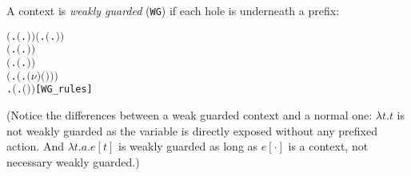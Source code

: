 A context is \emph{weakly guarded} (\texttt{WG}) if each hole is
underneath a prefix:
\begin{alltt}
\HOLTokenTurnstile{} \ensuremath{(}\HOLSymConst{\HOLTokenForall{}}.  \ensuremath{(}\HOLTokenLambda{}. \ensuremath{)}\ensuremath{)} \HOLSymConst{\HOLTokenConj{}} \ensuremath{(}\HOLSymConst{\HOLTokenForall{}} .   \HOLSymConst{\HOLTokenImp{}}  \ensuremath{(}\HOLTokenLambda{}. \HOLSymConst{\ensuremath{\ldotp}} \ensuremath{)}\ensuremath{)} \HOLSymConst{\HOLTokenConj{}}
   \ensuremath{(}\HOLSymConst{\HOLTokenForall{}} .   \HOLSymConst{\HOLTokenConj{}}   \HOLSymConst{\HOLTokenImp{}}  \ensuremath{(}\HOLTokenLambda{}.   \HOLSymConst{\ensuremath{+}}  \ensuremath{)}\ensuremath{)} \HOLSymConst{\HOLTokenConj{}}
   \ensuremath{(}\HOLSymConst{\HOLTokenForall{}} .   \HOLSymConst{\HOLTokenConj{}}   \HOLSymConst{\HOLTokenImp{}}  \ensuremath{(}\HOLTokenLambda{}.   \HOLSymConst{\ensuremath{\mid}}  \ensuremath{)}\ensuremath{)} \HOLSymConst{\HOLTokenConj{}}
   \ensuremath{(}\HOLSymConst{\HOLTokenForall{}} .   \HOLSymConst{\HOLTokenImp{}}  \ensuremath{(}\HOLTokenLambda{}. \ensuremath{(\nu}\ensuremath{)} \ensuremath{(} \ensuremath{)}\ensuremath{)}\ensuremath{)} \HOLSymConst{\HOLTokenConj{}}
   \HOLSymConst{\HOLTokenForall{}} .   \HOLSymConst{\HOLTokenImp{}}  \ensuremath{(}\HOLTokenLambda{}.  \ensuremath{(} \ensuremath{)} \ensuremath{)}\hfill{[WG_rules]}
\end{alltt}
(Notice the differences between a weak guarded context and a normal
one: $\lambda t. t$ is not weakly guarded as the variable is directly
exposed without any prefixed action. And $\lambda t. a.e[t]$ is weakly
guarded as long as $e[\cdot]$ is a context, not necessary weakly guarded.)

